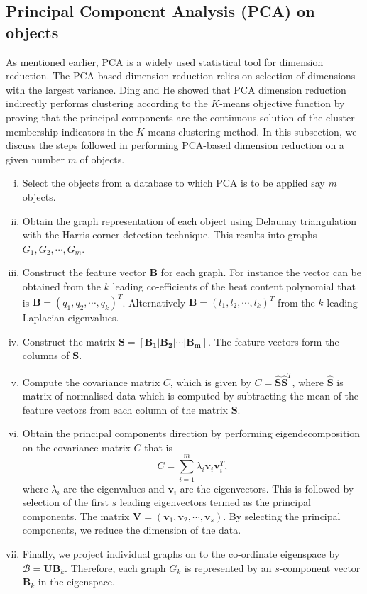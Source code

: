 \documentclass[10pt,a4paper]{article}
\begin{document}
\subsection{Principal Component Analysis (PCA) on objects}
As mentioned earlier, PCA is a widely used statistical tool for dimension reduction. The PCA-based dimension reduction relies on selection of dimensions with the largest variance. Ding and He \citep{ding2004k} showed that PCA dimension reduction indirectly performs clustering according to the $K$-means objective function by proving that the principal components are the continuous solution of the cluster membership indicators in the $K$-means clustering method.
In this subsection, we discuss the steps followed in performing  PCA-based dimension reduction on a given number $m$ of objects.
\begin{enumerate}[i)]
	\item Select the objects from a database to which PCA is to be applied say $m$ objects.
	\item Obtain the graph representation of each object using Delaunay triangulation with the Harris corner detection technique. This results into graphs $G_1, G_2, \cdots, G_m$.
	\item Construct the feature vector $\mathbf{B}$ for each graph. For instance the vector can be obtained from the $k$ leading co-efficients of the heat content polynomial that is $\mathbf{B} = (q_1,q_2, \cdots, q_k)^T$. Alternatively $\mathbf{B} = (l_1, l_2, \cdots, l_k)^T$ from the $k$ leading Laplacian eigenvalues.
	\item Construct the matrix $\mathbf{S}=[ \mathbf{B_1}|\mathbf{B_2}| \cdots | \mathbf{B_m}]$. The feature vectors form the columns of $\mathbf{S}$.
	\item Compute the covariance matrix $C$, which is given by $C = \hat{\mathbf{S}} \hat{\mathbf{S}}^T$, where $\hat{\mathbf{S}}$ is matrix of normalised data which is computed by subtracting the mean of the feature vectors from each column of the matrix $\mathbf{S}$.
	\item Obtain the principal components direction by performing eigendecomposition on the covariance matrix $C$ that is 
	\begin{equation}
	C = \sum _{i=1} ^m \lambda_i \mathbf{v}_i \mathbf{v}_i^T,
	\end{equation}
	where $\lambda_i$ are the eigenvalues and $\mathbf{v}_i$ are the eigenvectors. This is followed by selection of the first $s$ leading eigenvectors termed as the principal components. The matrix $\mathbf{V} = (\mathbf{v}_1, \mathbf{v}_2, \cdots, \mathbf{v}_s)$. By selecting the principal components, we reduce the dimension of the data.
	\item Finally, we project individual graphs on to the co-ordinate eigenspace by $\mathcal{B} = \mathbf{U} \mathbf{B}_k$. Therefore, each graph $G_k$ is represented by an $s$-component vector $\mathbf{B}_k$ in the eigenspace.	 
\end{enumerate}
\end{document}
